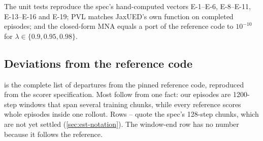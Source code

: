 The unit tests reproduce the spec's hand-computed vectors E-1--E-6, E-8--E-11, E-13--E-16
and E-19; PVL matches JaxUED's own function on completed episodes; and the closed-form
MNA equals a port of the reference code to $10^{-10}$ for $\lambda \in \{0.9, 0.95,
0.98\}$.

\subsection{Deviations from the reference code}
\label{sec:est-deviations}

 is the complete list of departures from the pinned reference code,
reproduced from the scorer specification. Most follow from one fact: our episodes are
\num{1200}-step windows that span several training chunks, while every reference scores
whole episodes inside one rollout. Rows -- quote the spec's 128-step
chunks, which are not yet settled (\cref{sec:est-notation}). The window-end row has no
number because it follows the reference.

